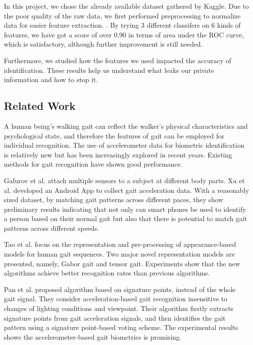 \documentclass{article} %
\begin{document}
In this project, we chose the already available dataset gathered by Kaggle. Due to the poor quality of the raw data, we first performed preprocessing to normalize data for easier feature extraction. . By trying 3 different classifers on 6 kinds of features, we have got a score of over 0.90 in terms of area under the ROC curve, which is satisfactory, although further improvement is still needed.

Furthermore, we studied how the features we used impacted the accuracy of identification. These results help us understand what leaks our private information and how to stop it.

\subsection{Related Work} 

A human being's walking gait can reflect the walker's physical characteristics and psychological state, and therefore the features of gait can be employed for individual recognition. The use of accelerometer data for biometric identification is relatively new but has been increasingly explored in recent years. Existing methods for gait recognition have shown good performance.
 
Gafurov et al. \cite{Gafurov:AIAT2007} attach multiple sensors to a subject at different body parts. Xu et al. \cite{Xu:ICB2012} developed an Android App to collect gait acceleration data. With a reasonably sized dataset, by matching gait patterns across different paces, they show preliminary results indicating that not only can smart phones be used to identify a person based on their normal gait but also that there is potential to match gait patterns across different speeds.

Tao et al.\cite{Tao:ToPAMI2007} focus on the representation and pre-processing of appearance-based models for human gait sequences. Two major novel representation models are presented, namely, Gabor gait and tensor gait. Experiments show that the new algorithms achieve better recognition rates than previous algorithms.

Pan et al. \cite{Pan:EL2009} proposed algorithm based on signature points, instead of the whole gait signal. They consider acceleration-based gait recognition insensitive to changes of lighting conditions and viewpoint. Their algorithm firstly extracts signature points from gait acceleration signals, and then identifies the gait pattern using a signature point-based voting scheme. The experimental results shows the accelerometer-based gait biometrics is promising. 
\end{document}
